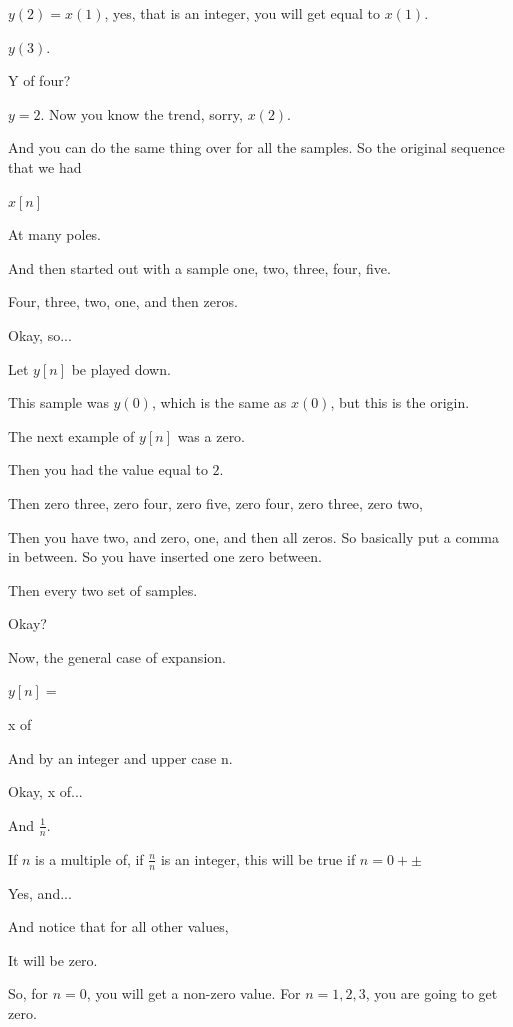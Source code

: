 \documentclass[11pt,a4paper]{article}
\begin{document}
$y(2) = x(1)$, yes, that is an integer, you will get equal to $x(1)$.

$y(3)$.

Y of four?

$y = 2$. Now you know the trend, sorry, $x(2)$.

And you can do the same thing over for all the samples. So the original sequence that we had

$x[n]$

At many poles.

And then started out with a sample one, two, three, four, five.

Four, three, two, one, and then zeros.

Okay, so...

Let $y[n]$ be played down.

This sample was $y(0)$, which is the same as $x(0)$, but this is the origin.

The next example of $y[n]$ was a zero.

Then you had the value equal to $2$.

Then zero three, zero four, zero five, zero four, zero three, zero two,

Then you have two, and zero, one, and then all zeros. So basically put a comma in between. So you have inserted one zero between.

Then every two set of samples.

Okay?

Now, the general case of expansion.

$y[n] =$

x of

And by an integer and upper case n.

Okay, x of...

And $\frac{1}{n}$.

If $n$ is a multiple of, if $\frac{n}{n}$ is an integer, this will be true if $n = 0 + \pm$

Yes, and...

And notice that for all other values,

It will be zero.

So, for $n = 0$, you will get a non-zero value. For $n = 1, 2, 3$, you are going to get zero.
\end{document}
